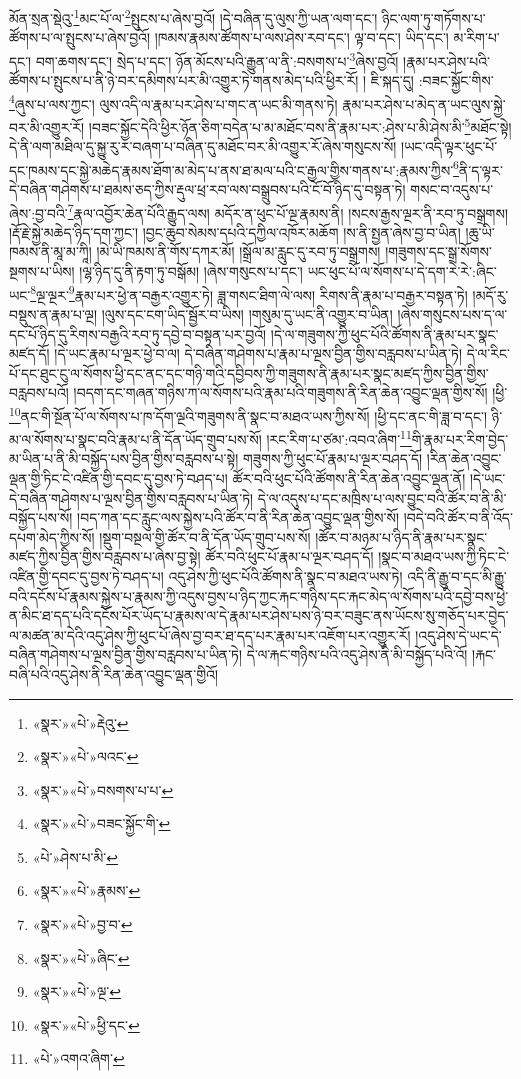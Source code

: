 མོན་སྲན་སྡེའུ་\footnote{«སྣར་»«པེ་»རྡེའུ་}མང་པོ་ལ་\footnote{«སྣར་»«པེ་»ལའང་}སྤུངས་པ་ཞེས་བྱའོ། །དེ་བཞིན་དུ་ལུས་ཀྱི་ཡན་ལག་དང་། ཉིང་ལག་ཏུ་གཏོགས་པ་ཚོགས་པ་ལ་སྤུངས་པ་ཞེས་བྱའོ། །ཁམས་རྣམས་ཚོགས་པ་ལས་ཤེས་རབ་དང་། ལྟ་བ་དང་། ཡིད་དང་། མ་རིག་པ་དང་། བག་ཆགས་དང་། སྲེད་པ་དང་། ཉོན་མོངས་པའི་རྒྱུན་ལ་ནི་:བསགས་པ་\footnote{«སྣར་»«པེ་»བསགས་པ་པ་}ཞེས་བྱའོ། །རྣམ་པར་ཤེས་པའི་ཚོགས་པ་སྤུངས་པ་ནི་ཉེ་བར་དམིགས་པར་མི་འགྱུར་ཏེ་གནས་མེད་པའི་ཕྱིར་རོ། །
ཇི་སྐད་དུ། :བཟང་སྐྱོང་གིས་\footnote{«སྣར་»«པེ་»བཟང་སྐྱོང་གི་}ཞུས་པ་ལས་ཀྱང་། ལུས་འདི་ལ་རྣམ་པར་ཤེས་པ་གང་ན་ཡང་མི་གནས་ཏེ། རྣམ་པར་ཤེས་པ་མེད་ན་ཡང་ལུས་སྐྱེ་བར་མི་འགྱུར་རོ། །བཟང་སྐྱོང་དེའི་ཕྱིར་ཉོན་ཅིག་བདེན་པ་མ་མཐོང་བས་ནི་རྣམ་པར་:ཤེས་པ་མི་ཤེས་མི་\footnote{«པེ་»ཤེས་པ་མི་}མཐོང་སྟེ། དེ་ནི་ལག་མཐིལ་དུ་སྐྱུ་རུ་ར་བཞག་པ་བཞིན་དུ་མཐོང་བར་མི་འགྱུར་རོ་ཞེས་གསུངས་སོ། །ཡང་འདི་ལྟར་ཕུང་པོ་དང་ཁམས་དང་སྐྱེ་མཆེད་རྣམས་ཐོག་མ་མེད་པ་ནས་ཐ་མལ་པའི་ང་རྒྱལ་གྱིས་གནས་པ་:རྣམས་ཀྱིས་\footnote{«སྣར་»«པེ་»རྣམས་}ནི་ད་ལྟར་དེ་བཞིན་གཤེགས་པ་ཐམས་ཅད་ཀྱིས་རྡུལ་ཕྲ་རབ་ལས་བསྒྲུབས་པའི་ངོ་བོ་ཉིད་དུ་བསྟན་ཏེ། གསང་བ་འདུས་པ་ཞེས་:བྱ་བའི་\footnote{«སྣར་»«པེ་»བྱ་བ་}རྣལ་འབྱོར་ཆེན་པོའི་རྒྱུད་ལས། མདོར་ན་ཕུང་པོ་ལྔ་རྣམས་ནི། །སངས་རྒྱས་ལྔར་ནི་རབ་ཏུ་བསྒྲགས། །རྡོ་རྗེ་སྐྱེ་མཆེད་ཉིད་དག་ཀྱང་། །བྱང་ཆུབ་སེམས་དཔའི་དཀྱིལ་འཁོར་མཆོག །ས་ནི་སྤྱན་ཞེས་བྱ་བ་ཡིན། །ཆུ་ཡི་ཁམས་ནི་མཱ་མ་ཀཱི། །མེ་ཡི་ཁམས་ནི་གོས་དཀར་མོ། །སྒྲོལ་མ་རླུང་དུ་རབ་ཏུ་བསྒྲགས། །གཟུགས་དང་སྒྲ་སོགས་སྔགས་པ་ཡིས། །ལྷ་ཉིད་དུ་ནི་རྟག་ཏུ་བསྒོམ། །ཞེས་གསུངས་པ་དང་། ཡང་ཕུང་པོ་ལ་སོགས་པ་དེ་དག་རེ་རེ་:ཞིང་ཡང་\footnote{«སྣར་»«པེ་»ཞིང་}ལྔ་ལྔར་\footnote{«སྣར་»«པེ་»ལྔ་}རྣམ་པར་ཕྱེ་ན་བརྒྱར་འགྱུར་ཏེ། ཟླ་གསང་ཐིག་ལེ་ལས། རིགས་ནི་རྣམ་པ་བརྒྱར་བསྟན་ཏེ། །མདོ་རུ་བསྡུས་ན་རྣམ་པ་ལྔ། །ལུས་དང་ངག་ཡིད་སྦྱོར་བ་ཡིས། །གསུམ་དུ་ཡང་ནི་འགྱུར་བ་ཡིན། །ཞེས་གསུངས་པས་ད་ལ་དང་པོ་ཉིད་དུ་རིགས་བརྒྱའི་རབ་ཏུ་དབྱེ་བ་བསྟན་པར་བྱའོ། །དེ་ལ་གཟུགས་ཀྱི་ཕུང་པོའི་ཚོགས་ནི་རྣམ་པར་སྣང་མཛད་དོ། །དེ་ཡང་རྣམ་པ་ལྔར་ཕྱེ་བ་ལ། དེ་བཞིན་གཤེགས་པ་རྣམ་པ་ལྔས་བྱིན་གྱིས་བརླབས་པ་ཡིན་ཏེ། དེ་ལ་རིང་པོ་དང་ཐུང་ངུ་ལ་སོགས་ཕྱི་དང་ནང་དང་གཉི་གའི་དབྱིབས་ཀྱི་གཟུགས་ནི་རྣམ་པར་སྣང་མཛད་ཀྱིས་བྱིན་གྱིས་བརླབས་པའོ། །བདག་དང་གཞན་གཉིས་ཀ་ལ་སོགས་པའི་རྣམ་པའི་གཟུགས་ནི་རིན་ཆེན་འབྱུང་ལྡན་གྱིས་སོ། །ཕྱི་\footnote{«སྣར་»«པེ་»ཕྱི་དང་}ནང་གི་སྔོན་པོ་ལ་སོགས་པ་ཁ་དོག་ལྔའི་གཟུགས་ནི་སྣང་བ་མཐའ་ཡས་ཀྱིས་སོ། །ཕྱི་དང་ནང་གི་ཟླ་བ་དང་། ཉི་མ་ལ་སོགས་པ་སྣང་བའི་རྣམ་པ་ནི་དོན་ཡོད་གྲུབ་པས་སོ། །རང་རིག་པ་ཙམ་:འབའ་ཞིག་\footnote{«པེ་»འགའ་ཞིག་}གི་རྣམ་པར་རིག་བྱེད་མ་ཡིན་པ་ནི་མི་བསྐྱོད་པས་བྱིན་གྱིས་བརླབས་པ་སྟེ། གཟུགས་ཀྱི་ཕུང་པོ་རྣམ་པ་ལྔར་བཤད་དོ། །རིན་ཆེན་འབྱུང་ལྡན་གྱི་ཏིང་ངེ་འཛིན་གྱི་དབང་དུ་བྱས་ཏེ་བཤད་པ། ཚོར་བའི་ཕུང་པོའི་ཚོགས་ནི་རིན་ཆེན་འབྱུང་ལྡན་ནོ། །དེ་ཡང་དེ་བཞིན་གཤེགས་པ་ལྔས་བྱིན་གྱིས་བརླབས་པ་ཡིན་ཏེ། དེ་ལ་འདུས་པ་དང་མཁྲིས་པ་ལས་བྱུང་བའི་ཚོར་བ་ནི་མི་བསྐྱོད་པས་སོ། །བད་ཀན་དང་རླུང་ལས་སྐྱེས་པའི་ཚོར་བ་ནི་རིན་ཆེན་འབྱུང་ལྡན་གྱིས་སོ། །བདེ་བའི་ཚོར་བ་ནི་འོད་དཔག་མེད་ཀྱིས་སོ། །སྡུག་བསྔལ་གྱི་ཚོར་བ་ནི་དོན་ཡོད་གྲུབ་པས་སོ། །ཚོར་བ་མཉམ་པ་ཉིད་ནི་རྣམ་པར་སྣང་མཛད་ཀྱིས་བྱིན་གྱིས་བརླབས་པ་ཞེས་བྱ་སྟེ། ཚོར་བའི་ཕུང་པོ་རྣམ་པ་ལྔར་བཤད་དོ། །སྣང་བ་མཐའ་ཡས་ཀྱི་ཏིང་ངེ་འཛིན་གྱི་དབང་དུ་བྱས་ཏེ་བཤད་པ། འདུ་ཤེས་ཀྱི་ཕུང་པོའི་ཚོགས་ནི་སྣང་བ་མཐའ་ཡས་ཏེ། འདི་ནི་རྒྱུ་བ་དང་མི་རྒྱུ་བའི་དངོས་པོ་རྣམས་སྐྱེས་པ་རྣམས་ཀྱི་འདུས་བྱས་པ་ཉིད་ཀྱང་རྐང་གཉིས་དང་རྐང་མེད་ལ་སོགས་པའི་དབྱེ་བས་ཕྱེ་ན་མིང་ཐ་དད་པའི་དངོས་པོར་ཡོད་པ་རྣམས་ལ་དེ་རྣམ་པར་ཤེས་པས་ཉེ་བར་བཟུང་ནས་ཡོངས་སུ་གཅོད་པར་བྱེད་ལ་མཚན་མ་དེའི་འདུ་ཤེས་ཀྱི་ཕུང་པོ་ཞེས་བྱ་བར་ཐ་དད་པར་རྣམ་པར་འཇོག་པར་འགྱུར་རོ། །འདུ་ཤེས་དེ་ཡང་དེ་བཞིན་གཤེགས་པ་ལྔས་བྱིན་གྱིས་བརླབས་པ་ཡིན་ཏེ། དེ་ལ་རྐང་གཉིས་པའི་འདུ་ཤེས་ནི་མི་བསྐྱོད་པའི་འོ། །རྐང་བཞི་པའི་འདུ་ཤེས་ནི་རིན་ཆེན་འབྱུང་ལྡན་གྱིའོ། 